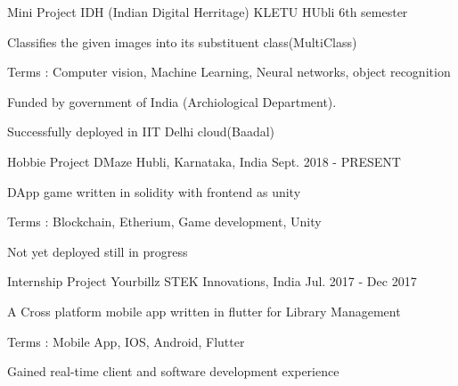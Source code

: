 


\begin{cventries}


\cventry
{Mini Project} %
{IDH (Indian Digital Herritage)} %
{KLETU HUbli} %
{6th semester} %
{ %
\begin{cvitems}
\item {Classifies the given images into its substituent class(MultiClass)}
\item {Terms : Computer vision, Machine Learning, Neural networks, object recognition}
\item {Funded by government of India  (Archiological Department).}
\item{Successfully deployed in IIT Delhi cloud(Baadal)}
\end{cvitems}
}


\cventry
{Hobbie Project} %
{DMaze} %
{Hubli, Karnataka, India} %
{Sept. 2018 - PRESENT} %
{ %
\begin{cvitems}
\item {DApp game written in solidity with frontend as unity}
\item {Terms : Blockchain, Etherium, Game development, Unity}
\item {Not yet deployed still in progress}
\end{cvitems}
}


\cventry
{Internship Project} %
{Yourbillz} %
{STEK Innovations, India} %
{Jul. 2017 - Dec 2017} %
{ %
\begin{cvitems}
\item {A Cross platform mobile app written in flutter for Library Management}
\item {Terms : Mobile App, IOS, Android, Flutter}
\item {Gained real-time client and software development experience}
\end{cvitems}
}


\end{cventries}
